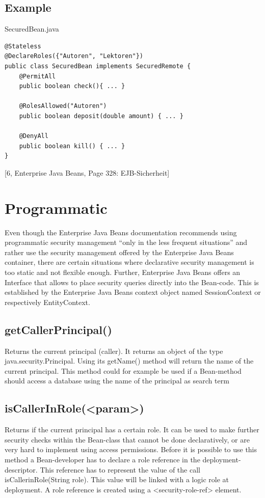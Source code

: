 \documentclass[12pt,a4paper]{report}
\begin{document}
\subsection{Example}

\begin{bclogo}[couleur=yellow!15,arrondi=0.1,logo=\bccrayon, ombre = true]{SecuredBean.java}
\begin{lstlisting}[style=Java]
@Stateless
@DeclareRoles({"Autoren", "Lektoren"})
public class SecuredBean implements SecuredRemote {
	@PermitAll
	public boolean check(){ ... }
	
	@RolesAllowed("Autoren")
	public boolean deposit(double amount) { ... }
	
	@DenyAll
	public boolean kill() { ... }
}
\end{lstlisting}
\end{bclogo}
[6, Enterprise Java Beans, Page 328: EJB-Sicherheit]

\section{Programmatic}
Even though the Enterprise Java Beans documentation recommends using programmatic security management “only in the less frequent situations” and rather use the security management offered by the Enterprise Java Beans container, there are certain situations where declarative security management is too static and not flexible enough. Further, Enterprise Java Beans offers an Interface that allows to place security queries directly into the Bean-code.
This is established by the Enterprise Java Beans context object named SessionContext or respectively EntityContext.

\subsection{getCallerPrincipal()}
Returns the current principal (caller). It returns an object of the type java.security.Principal. Using its getName() method will return the name of the current principal.
This method could for example be used if a Bean-method should access a database using the name of the principal as search term

\subsection{isCallerInRole(<param>)}
Returns if the current principal has a certain role. It can be used to make further security checks within the Bean-class that cannot be done declaratively, or are very hard to implement using access permissions.
Before it is possible to use this method a Bean-developer has to declare a role reference in the deployment-descriptor. This reference has to represent the value of the call isCallerinRole(String role). This value will be linked with a logic role at deployment. A role reference is created using a <security-role-ref> element.
\end{document}
